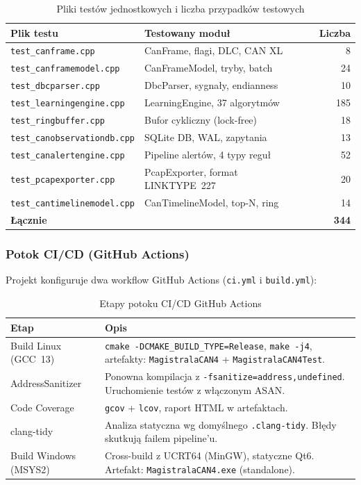 \documentclass[12pt, a4paper]{article}
\begin{document}
\begin{table}[H]
\caption{Pliki testów jednostkowych i liczba przypadków testowych}
\label{tab:tests2}
\centering
\small
\begin{tabular}{p{6.0cm}p{5.5cm}r}
\toprule
\textbf{Plik testu} & \textbf{Testowany moduł} & \textbf{Liczba} \\
\midrule
\texttt{test\_canframe.cpp}         & CanFrame, flagi, DLC, CAN XL      & 8  \\
\texttt{test\_canframemodel.cpp}    & CanFrameModel, tryby, batch        & 24 \\
\texttt{test\_dbcparser.cpp}        & DbcParser, sygnały, endianness     & 10 \\
\texttt{test\_learningengine.cpp}   & LearningEngine, 37 algorytmów      & 185 \\
\texttt{test\_ringbuffer.cpp}       & Bufor cykliczny (lock-free)        & 18 \\
\texttt{test\_canobservationdb.cpp} & SQLite DB, WAL, zapytania          & 13 \\
\texttt{test\_canalertengine.cpp}   & Pipeline alertów, 4 typy reguł     & 52 \\
\texttt{test\_pcapexporter.cpp}     & PcapExporter, format LINKTYPE~227  & 20 \\
\texttt{test\_cantimelinemodel.cpp} & CanTimelineModel, top-N, ring      & 14 \\
\midrule
\textbf{Łącznie}                    &                                    & \textbf{344} \\
\bottomrule
\end{tabular}
\end{table}

\subsubsection*{Potok CI/CD (GitHub Actions)}

Projekt konfiguruje dwa workflow GitHub Actions (\texttt{ci.yml} i \texttt{build.yml}):

\begin{table}[H]
\caption{Etapy potoku CI/CD GitHub Actions}
\label{tab:cicd}
\centering
\small
\begin{tabular}{p{4.5cm}p{10.0cm}}
\toprule
\textbf{Etap} & \textbf{Opis} \\
\midrule
Build Linux (GCC~13) &
  \texttt{cmake -DCMAKE\_BUILD\_TYPE=Release}, \texttt{make -j4},
  artefakty: \texttt{MagistralaCAN4} + \texttt{MagistralaCAN4Test}. \\
AddressSanitizer &
  Ponowna kompilacja z \texttt{-fsanitize=address,undefined}.
  Uruchomienie testów z włączonym ASAN. \\
Code Coverage &
  \texttt{gcov} + \texttt{lcov}, raport HTML w artefaktach. \\
clang-tidy &
  Analiza statyczna wg domyślnego \texttt{.clang-tidy}. Błędy skutkują
  failem pipeline'u. \\
Build Windows (MSYS2) &
  Cross-build z UCRT64 (MinGW), statyczne Qt6.
  Artefakt: \texttt{MagistralaCAN4.exe} (standalone). \\
\bottomrule
\end{tabular}
\end{table}
\end{document}
